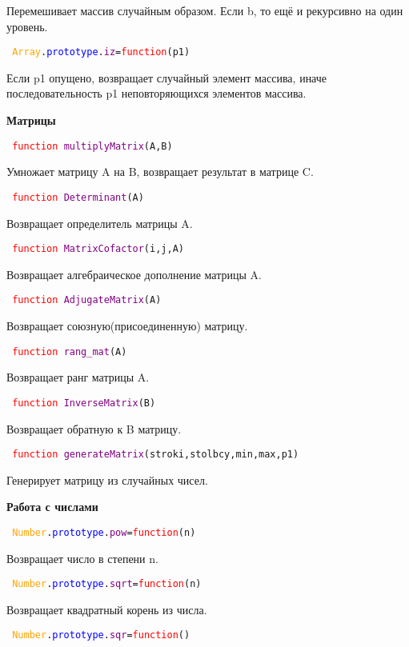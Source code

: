 Перемешивает массив случайным образом. Если b, то ещё и рекурсивно на один уровень.

\hypertarget{iz}{\texttt{
		\textcolor{Orange}{Array}.\textcolor{Blue}{prototype}.\textcolor{Purple}{iz}=\textcolor{Red}{function}(p1)
	}}

Если p1 опущено, возвращает случайный элемент массива, иначе последовательность p1 неповторяющихся элементов массива.

\textbf{Матрицы}

\texttt{
	\textcolor{Red}{function} \textcolor{Purple}{multiplyMatrix}(A,B)
}

Умножает матрицу A на B, возвращает результат в матрице C.

\texttt{
	\textcolor{Red}{function} \textcolor{Purple}{Determinant}(A)
}

Возвращает определитель матрицы A.

\texttt{
	\textcolor{Red}{function} \textcolor{Purple}{MatrixCofactor}(i,j,A)
}

Возвращает алгебраическое дополнение матрицы A.

\texttt{
	\textcolor{Red}{function} \textcolor{Purple}{AdjugateMatrix}(A)
}

Возвращает союзную(присоединенную) матрицу.

\texttt{
	\textcolor{Red}{function} \textcolor{Purple}{rang\_mat}(А)
}

Возвращает ранг матрицы A.

\texttt{
	\textcolor{Red}{function} \textcolor{Purple}{InverseMatrix}(B)
}

Возвращает обратную  к B матрицу.

\texttt{
	\textcolor{Red}{function} \textcolor{Purple}{generateMatrix}(stroki,stolbcy,min,max,p1)
}

Генерирует матрицу из случайных чисел.

\textbf{Работа с числами}

\texttt{
	\textcolor{Orange}{Number}.\textcolor{Blue}{prototype}.\textcolor{Purple}{pow}=\textcolor{Red}{function}(n)
}

Возвращает число в степени n.

\texttt{
	\textcolor{Orange}{Number}.\textcolor{Blue}{prototype}.\textcolor{Purple}{sqrt}=\textcolor{Red}{function}(n)
}

Возвращает квадратный корень из числа.

\texttt{
	\textcolor{Orange}{Number}.\textcolor{Blue}{prototype}.\textcolor{Purple}{sqr}=\textcolor{Red}{function}()
}

